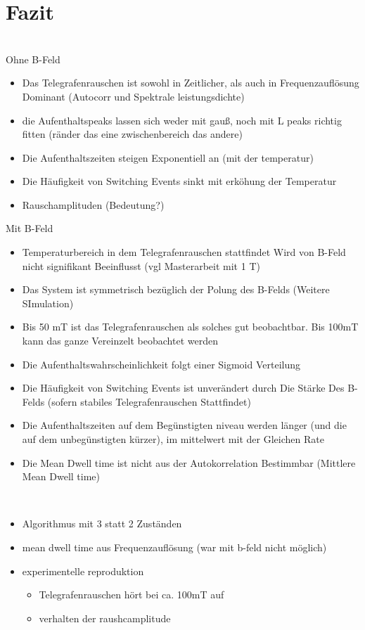 \documentclass[main.tex]{subfiles}
\begin{document}
\newpage
\section{Fazit}

\\
Ohne B-Feld
\begin{itemize}
    \item Das Telegrafenrauschen ist sowohl in Zeitlicher, als auch in Frequenzauflösung Dominant (Autocorr und Spektrale leistungsdichte)
    \item die Aufenthaltspeaks lassen sich weder mit gauß, noch mit L peaks richtig fitten (ränder das eine zwischenbereich das andere)
    \item Die Aufenthaltszeiten steigen Exponentiell an (mit der temperatur)
    \item Die Häufigkeit von Switching Events sinkt mit erköhung der Temperatur
    \item Rauschamplituden (Bedeutung?)
\end{itemize}

Mit B-Feld
\begin{itemize}
    \item Temperaturbereich in dem Telegrafenrauschen stattfindet Wird von B-Feld nicht signifikant Beeinflusst (vgl Masterarbeit mit 1 T)
    \item Das System ist symmetrisch bezüglich der Polung des B-Felds (Weitere SImulation)
    \item Bis 50 mT ist das Telegrafenrauschen als solches gut beobachtbar. Bis 100mT kann das ganze Vereinzelt beobachtet werden
    \item Die Aufenthaltswahrscheinlichkeit folgt einer Sigmoid Verteilung
    \item Die Häufigkeit von Switching Events ist unverändert durch Die Stärke Des B-Felds (sofern stabiles Telegrafenrauschen Stattfindet)
    \item Die Aufenthaltszeiten auf dem Begünstigten niveau werden länger (und die auf dem unbegünstigten kürzer), im mittelwert mit der Gleichen Rate
    \item Die Mean Dwell time ist nicht aus der Autokorrelation Bestimmbar (Mittlere Mean Dwell time)
\end{itemize}
\\
\begin{itemize}
    \item Algorithmus mit 3 statt 2 Zuständen
    \item mean dwell time aus Frequenzauflösung (war mit b-feld nicht möglich)
    \item experimentelle reproduktion 
    \begin{itemize}
        \item Telegrafenrauschen hört bei ca. 100mT auf
        \item verhalten der raushcamplitude
    \end{itemize}
\end{itemize}
\end{document}
